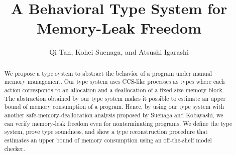 \documentclass[english]{jssst_ppl} %
\title{A Behavioral Type System for \\ Memory-Leak Freedom}
\author{Qi Tan, Kohei Suenaga, and Atsushi Igarashi}
\newif\ifdraft\draftfalse
\theoremstyle{definition}
\begin{document}
\maketitle
\begin{abstract}
We propose a type system to abstract the behavior of a program under
manual memory management. Our type system uses CCS-like processes as
types where each action corresponds to an allocation and a
deallocation of a fixed-size memory block. The abstraction obtained by
our type system makes it possible to estimate an upper bound of memory
consumption of a program. Hence, by using our type system with another
safe-memory-deallocation analysis proposed by Suenaga and Kobayashi,
we can verify memory-leak freedom even for nonterminating programs.
We define the type system, prove type soundness, and show a type
reconstruction procedure that estimates an upper bound of memory
consumption using an off-the-shelf model checker.
\end{abstract}











\ifdraft
\elseif
\newpage
\appendix
\section*{Appendix}




\fi
\end{document}
